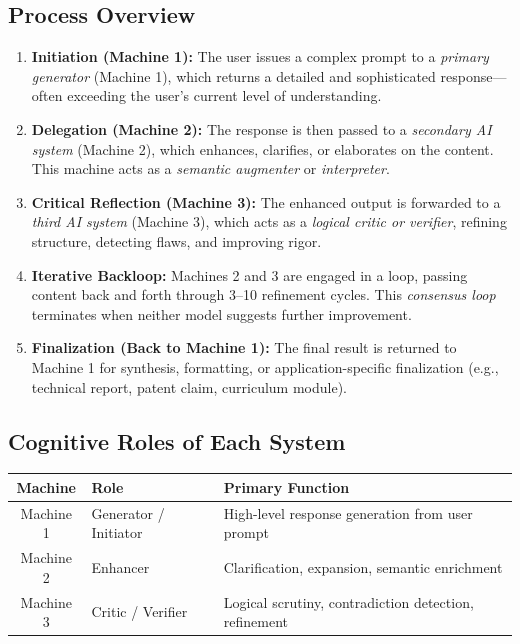 \documentclass{article}
\begin{document}
\subsection{Process Overview}

\begin{enumerate}
    \item \textbf{Initiation (Machine 1):} The user issues a complex prompt to a \emph{primary generator} (Machine 1), which returns a detailed and sophisticated response—often exceeding the user’s current level of understanding.
    
    \item \textbf{Delegation (Machine 2):} The response is then passed to a \emph{secondary AI system} (Machine 2), which enhances, clarifies, or elaborates on the content. This machine acts as a \textit{semantic augmenter} or \textit{interpreter}.
    
    \item \textbf{Critical Reflection (Machine 3):} The enhanced output is forwarded to a \emph{third AI system} (Machine 3), which acts as a \textit{logical critic or verifier}, refining structure, detecting flaws, and improving rigor.
    
    \item \textbf{Iterative Backloop:} Machines 2 and 3 are engaged in a loop, passing content back and forth through 3–10 refinement cycles. This \textit{consensus loop} terminates when neither model suggests further improvement.
    
    \item \textbf{Finalization (Back to Machine 1):} The final result is returned to Machine 1 for synthesis, formatting, or application-specific finalization (e.g., technical report, patent claim, curriculum module).
\end{enumerate}

\subsection{Cognitive Roles of Each System}

\begin{center}
\begin{tabular}{|c|l|l|}
\hline
\textbf{Machine} & \textbf{Role} & \textbf{Primary Function} \\
\hline
Machine 1 & Generator / Initiator & High-level response generation from user prompt \\
Machine 2 & Enhancer & Clarification, expansion, semantic enrichment \\
Machine 3 & Critic / Verifier & Logical scrutiny, contradiction detection, refinement \\
\hline
\end{tabular}
\end{center}
\end{document}
